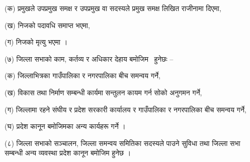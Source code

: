 (क) प्रमुखले उपप्रमुख समक्ष र उपप्रमुख वा सदस्यले प्रमुख समक्ष लिखित राजीनामा दिएमा,

(ख) निजको पदावधि समाप्त भएमा,

(ग) निजको मृत्यु भएमा ।

(७) जिल्ला सभाको काम, कर्तव्य र अधिकार देहाय बमोजिम  हुनेछः –

(क) जिल्लाभित्रका गाउँपालिका र नगरपालिका बीच समन्वय गर्ने,

(ख) विकास तथा निर्माण सम्बन्धी कार्यमा सन्तुलन कायम गर्न सोको अनुगमन गर्ने,

(ग) जिल्लामा रहने संघीय र प्रदेश सरकारी कार्यालय र गाउँपालिका र नगरपालिका बीच समन्वय गर्ने,

(घ) प्रदेश कानून बमोजिमका अन्य कार्यहरू गर्ने ।

(८) जिल्ला सभाको सञ्चालन, जिल्ला समन्वय समितिका सदस्यले पाउने सुविधा तथा जिल्ला सभा सम्बन्धी अन्य व्यवस्था प्रदेश कानून
बमोजिम हुनेछ ।